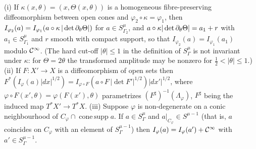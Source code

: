 \begin{lemma}\label{hj:lem:osc-change}
  (i) If $\kappa(x,\theta)=(x,\Theta(x,\theta))$ is a homogeneous
  fibre-preserving diffeomorphism between open cones and $\varphi_2\circ\kappa=
  \varphi_1$, then $I_{\varphi_2}(a)=I_{\varphi_1}(a\circ\kappa\,|\det
  \partial_\theta\Theta|)$ for $a\in S^\mu_{\Gamma_2}$, and
  $a\circ\kappa|\det\partial_\theta\Theta|=a_1+r$ with $a_1\in S^\mu_{\Gamma_1}$ and $r$
  smooth with compact support, so that $I_{\varphi_2}(a)=I_{\varphi_1}(a_1)$ modulo
  $\mathcal{C}^\infty$.  (The hard cut-off $|\theta|\le1$ in the definition of $S^\mu_\Gamma$ is not
  invariant under $\kappa$: for $\Theta=2\theta$ the transformed amplitude may be
  nonzero for $\frac12<|\theta|\le1$.)
  (ii) If $F:X'\to X$ is a diffeomorphism of open sets then
  $F^*(I_\varphi(a)|dx|^{1/2})=I_{\varphi\circ F}(a\circ F\,|\det F'|^{1/2})
  |dx'|^{1/2}$, where $\varphi\circ F(x',\theta)=\varphi(F(x'),\theta)$
  parametrizes $(F^\sharp)^{-1}(\Lambda_\varphi)$, $F^\sharp$ being the induced
  map $T^*X'\to T^*X$.
  (iii) Suppose $\varphi$ is non-degenerate on a conic neighbourhood of
  $C_\varphi\cap\operatorname{cone\,supp}a$.  If $a\in S^\mu_\Gamma$ and
  $a|_{C_\varphi}\in S^{\mu-1}$ (that is, $a$
  coincides on $C_\varphi$ with an element of $S^{\mu-1}_\Gamma$) then
  $I_\varphi(a)=I_\varphi(a')+\mathcal{C}^\infty$ with $a'\in S^{\mu-1}_\Gamma$.
\end{lemma}
